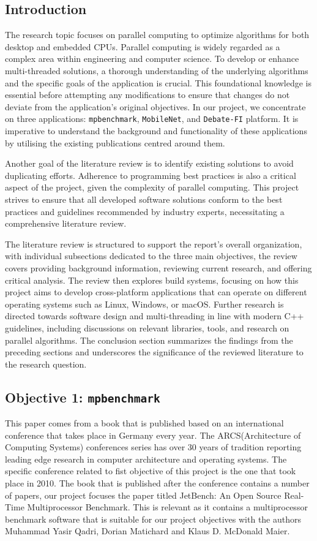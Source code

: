 \subsection{Introduction}
The research topic focuses on parallel computing to optimize algorithms for both desktop and embedded CPUs. Parallel computing is widely regarded as a complex area within engineering and computer science. To develop or enhance multi-threaded solutions, a thorough understanding of the underlying algorithms and the specific goals of the application is crucial. This foundational knowledge is essential before attempting any modifications to ensure that changes do not deviate from the application’s original objectives. In our project, we concentrate on three applications: \texttt{mpbenchmark}, \texttt{MobileNet}, and \texttt{Debate-FI} platform. It is imperative to understand the background and functionality of these applications by utilising the existing publications centred around them. 

Another goal of the literature review is to identify existing solutions to avoid duplicating efforts. Adherence to programming best practices is also a critical aspect of the project, given the complexity of parallel computing. This project strives to ensure that all developed software solutions conform to the best practices and guidelines recommended by industry experts, necessitating a comprehensive literature review.

The literature review is structured to support the report's overall organization, with individual subsections dedicated to the three main objectives, the review covers providing background information, reviewing current research, and offering critical analysis. The review then explores build systems, focusing on how this project aims to develop cross-platform applications that can operate on different operating systems such as Linux, Windows, or macOS. Further research is directed towards software design and multi-threading in line with modern C++ guidelines, including discussions on relevant libraries, tools, and research on parallel algorithms. The conclusion section summarizes the findings from the preceding sections and underscores the significance of the reviewed literature to the research question.

\subsection{Objective 1: \texttt{mpbenchmark}}
This paper comes from a book that is published based on an international conference that takes place in Germany every year. The ARCS(Architecture of Computing Systems) conferences series has over 30 years of tradition reporting leading edge research in computer architecture and operating systems. The specific conference related to fist objective of this project is the one that took place in 2010. The book that is published after the conference contains a number of papers, our project focuses the paper titled JetBench: An Open Source Real-Time Multiprocessor Benchmark\cite{JetBench}. This is relevant as it contains a multiprocessor benchmark software that is suitable for our project objectives with the authors Muhammad Yasir Qadri, Dorian Matichard and Klaus D. McDonald Maier. 


